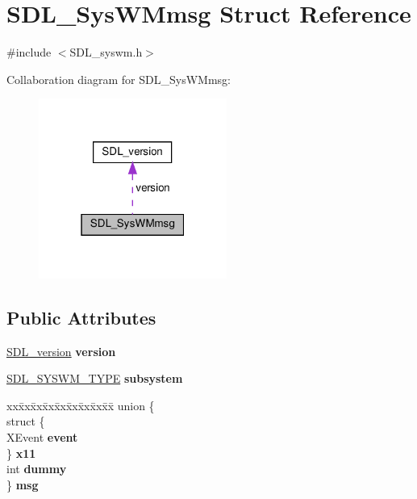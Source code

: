 \hypertarget{structSDL__SysWMmsg}{}\section{S\+D\+L\+\_\+\+Sys\+W\+Mmsg Struct Reference}
\label{structSDL__SysWMmsg}


{\ttfamily \#include $<$S\+D\+L\+\_\+syswm.\+h$>$}



Collaboration diagram for S\+D\+L\+\_\+\+Sys\+W\+Mmsg\+:\nopagebreak
\begin{figure}[H]
\begin{center}
\leavevmode
\includegraphics[width=175pt]{structSDL__SysWMmsg__coll__graph}
\end{center}
\end{figure}
\subsection*{Public Attributes}
\begin{DoxyCompactItemize}
\item 
\mbox{\label{structSDL__SysWMmsg_a95f9aae58d18ee8fac556416b322a5fb}} 
\hyperlink{structSDL__version}{S\+D\+L\+\_\+version} {\bfseries version}
\item 
\mbox{\label{structSDL__SysWMmsg_a7c3900af5ea797f1318fc77ee0ecd11b}} 
\hyperlink{SDL__syswm_8h_a064c26598287280fff2a00d6758ac4f7}{S\+D\+L\+\_\+\+S\+Y\+S\+W\+M\+\_\+\+T\+Y\+PE} {\bfseries subsystem}
\item 
\mbox{\label{structSDL__SysWMmsg_a8890abd547a386afa3a822f15568c162}} 
\begin{tabbing}
xx\=xx\=xx\=xx\=xx\=xx\=xx\=xx\=xx\=\kill
union \{\\
\>struct \{\\
\>\>XEvent {\bfseries event}\\
\>\} {\bfseries x11}\\
\>int {\bfseries dummy}\\
\} {\bfseries msg}\\

\end{tabbing}\end{DoxyCompactItemize}


